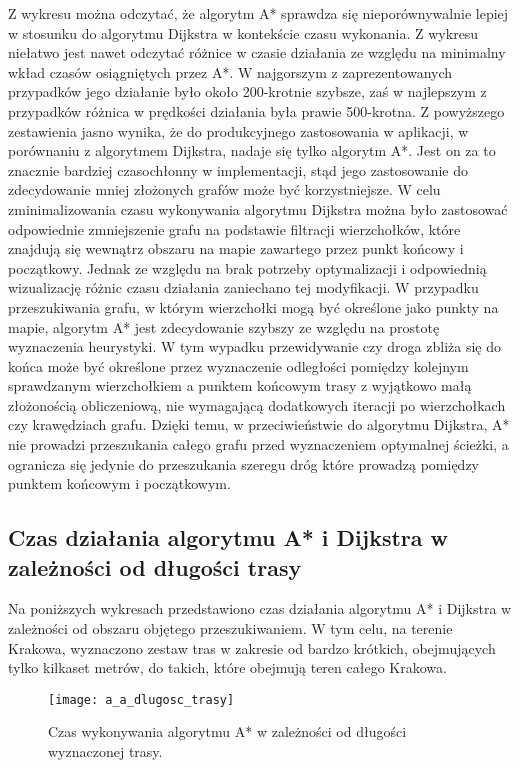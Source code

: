 Z wykresu można odczytać, że algorytm A* sprawdza się nieporównywalnie lepiej w stosunku do algorytmu Dijkstra w kontekście czasu wykonania. Z wykresu niełatwo jest nawet odczytać różnice w czasie działania ze względu na minimalny wkład czasów osiągniętych przez A*. W najgorszym z zaprezentowanych przypadków jego działanie było około 200-krotnie szybsze, zaś w najlepszym z przypadków różnica w prędkości działania była prawie 500-krotna. Z powyższego zestawienia jasno wynika, że do produkcyjnego zastosowania w aplikacji, w porównaniu z algorytmem Dijkstra, nadaje się tylko algorytm A*. Jest on za to znacznie bardziej czasochłonny w implementacji, stąd jego zastosowanie do zdecydowanie mniej złożonych grafów może być korzystniejsze. W celu zminimalizowania czasu wykonywania algorytmu Dijkstra można było zastosować odpowiednie zmniejszenie grafu na podstawie filtracji wierzchołków, które znajdują się wewnątrz obszaru na mapie zawartego przez punkt końcowy i początkowy. Jednak ze względu na brak potrzeby optymalizacji i odpowiednią wizualizację różnic czasu działania zaniechano tej modyfikacji.
W przypadku przeszukiwania grafu, w którym wierzchołki mogą być określone jako punkty na mapie, algorytm A* jest zdecydowanie szybszy ze względu na prostotę wyznaczenia heurystyki. W tym wypadku przewidywanie czy droga zbliża się do końca może być określone przez wyznaczenie odległości pomiędzy kolejnym sprawdzanym wierzchołkiem a punktem końcowym trasy z wyjątkowo małą złożonością obliczeniową, nie wymagającą dodatkowych iteracji po wierzchołkach czy krawędziach grafu. Dzięki temu, w przeciwieństwie do algorytmu Dijkstra, A* nie prowadzi przeszukania całego grafu przed wyznaczeniem optymalnej ścieżki, a ogranicza się jedynie do przeszukania szeregu dróg które prowadzą pomiędzy punktem końcowym i początkowym. \newline

\subsection{Czas działania algorytmu A* i Dijkstra w zależności od długości trasy}

Na poniższych wykresach przedstawiono czas działania algorytmu A* i Dijkstra w zależności od obszaru objętego przeszukiwaniem. W tym celu, na terenie Krakowa, wyznaczono zestaw tras w zakresie od bardzo krótkich, obejmujących tylko kilkaset metrów, do takich, które obejmują teren całego Krakowa.

\begin{figure}[H]
\centering
\texttt{[image: a\_a\_dlugosc\_trasy]}
\caption{Czas wykonywania algorytmu A* w zależności od długości wyznaczonej trasy.}
\end{figure}

